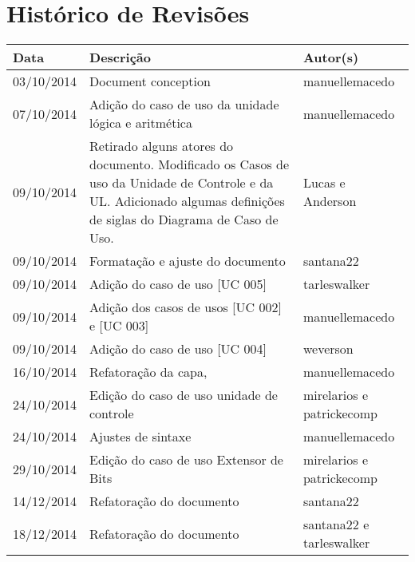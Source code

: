 \documentclass{article}
\begin{document}

\capa
\newpage

\section*{\center Histórico de Revisões}
  \vspace*{1cm}
  \begin{table}[ht]
    \centering
    \begin{tabular}[pos]{|m{2cm} | m{7.2cm} | m{3.8cm}|} 
      \hline
      \cellcolor[gray]{0.9}
      \textbf{Data} & \cellcolor[gray]{0.9}\textbf{Descrição} & \cellcolor[gray]{0.9}\textbf{Autor(s)}\\ \hline
      
      \small 03/10/2014 & \small Document conception & \small manuellemacedo \\ \hline      
	
      \small 07/10/2014 & \small Adição do caso de uso da unidade lógica e aritmética & \small manuellemacedo \\ \hline
      \small 09/10/2014 & \small Retirado alguns atores do documento. Modificado os Casos de uso da Unidade de Controle e da UL. Adicionado algumas definições de siglas do Diagrama de Caso de Uso. & \small Lucas e Anderson \\ \hline 
      \small 09/10/2014 & \small Formatação e ajuste do documento & \small santana22 \\ \hline
      \small 09/10/2014 & \small Adição do caso de uso [UC 005] & \small tarleswalker \\ \hline
      \small 09/10/2014 & \small Adição dos casos de usos [UC 002] e [UC 003] & \small manuellemacedo \\ \hline
       \small 09/10/2014 & \small Adição do caso de uso [UC 004] & \small weverson \\ \hline
       \small 16/10/2014 & \small Refatoração da capa,  & \small manuellemacedo \\ \hline
       \small 24/10/2014 & \small Edição do caso de uso unidade de controle  & \small mirelarios e patrickecomp \\ \hline
       \small 24/10/2014 & \small Ajustes de sintaxe  & \small manuellemacedo \\ \hline
       \small 29/10/2014 & \small Edição do caso de uso Extensor de Bits  & \small mirelarios e patrickecomp \\ \hline
       \small 14/12/2014 & \small Refatoração do documento & \small santana22 \\ \hline
		\small 18/12/2014 & \small Refatoração do 	documento & \small santana22 e tarleswalker\\ \hline       
    \end{tabular}
  \end{table}
\end{document}
